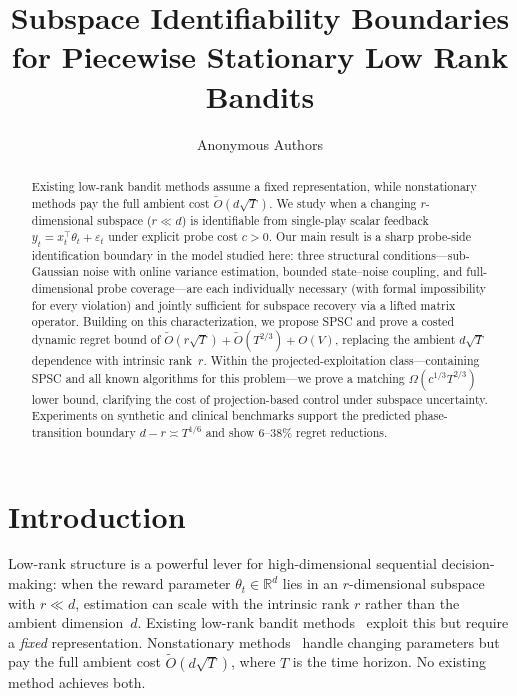 \documentclass{article}
\title{Subspace Identifiability Boundaries for Piecewise Stationary Low Rank Bandits}
\author{
  Anonymous Authors
}
\newcommand{\R}{\mathbb{R}}
\begin{document}
\maketitle


\begin{abstract}
  Existing low-rank bandit methods assume a fixed representation, while nonstationary methods
  pay the full ambient cost $\widetilde{O}(d\sqrt{T})$.
  We study when a changing $r$-dimensional subspace ($r \ll d$) is identifiable from
  single-play scalar feedback $y_t = x_t^\top\theta_t + \varepsilon_t$ under explicit probe cost $c > 0$.
  Our main result is a sharp probe-side identification boundary in the model studied here:
  three structural conditions---sub-Gaussian noise with online variance estimation, bounded
  state--noise coupling, and full-dimensional probe coverage---are each individually necessary
  (with formal impossibility for every violation) and jointly sufficient for subspace recovery
  via a lifted matrix operator.
  Building on this characterization, we propose SPSC and prove a costed dynamic regret bound
  of $\widetilde{O}(r\sqrt{T}) + \widetilde{O}(T^{2/3}) + O(V)$, replacing the ambient $d\sqrt{T}$
  dependence with intrinsic rank~$r$.
  Within the projected-exploitation class---containing SPSC and all known algorithms for this
  problem---we prove a matching $\Omega(c^{1/3}T^{2/3})$ lower bound, clarifying the cost of
  projection-based control under subspace uncertainty.
  Experiments on synthetic and clinical benchmarks support the predicted
  phase-transition boundary $d - r \asymp T^{1/6}$ and show 6--38\% regret reductions.
  \end{abstract}
\section{Introduction}
\label{sec:intro}
  Low-rank structure is a powerful lever for high-dimensional
  sequential decision-making: when the reward parameter
  $\theta_t \in \R^d$ lies in an $r$-dimensional subspace with
  $r \ll d$, estimation can scale with the intrinsic
  rank $r$ rather than the ambient dimension~$d$. Existing low-rank
  bandit methods~\citep{jun2019bilinear,pmlr-v235-jedra24a,lu2021lowrank}
  exploit this but require a \emph{fixed} representation.
  Nonstationary methods~\citep{russac2019weighted,cheung2019learning}
  handle changing parameters but pay the full ambient cost
  $\widetilde{O}(d\sqrt{T})$, where $T$ is the time horizon.
  No existing method achieves both.
\end{document}
